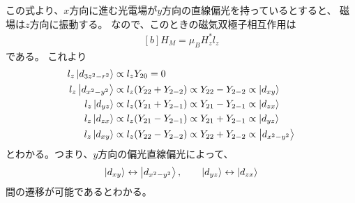 \documentclass[../ap_2011.tex]{subfiles}
\begin{document}
この式より、\(x\)方向に進む光電場が\(y\)方向の直線偏光を持っているとすると、
磁場は\(z\)方向に振動する。
なので、このときの磁気双極子相互作用は
\begin{equation}\begin{aligned}[b]
    H_M = \mu_BH_z^* l_z
\end{aligned}\end{equation}
である。
これより
\begin{equation}\begin{aligned}[b]
    l_z\ket{d_{3z^2-r^2}} &\propto l_z Y_{20} = 0\\
    l_z\ket{d_{x^2-y^2}} &\propto l_z (Y_{22}+Y_{2-2}) \propto Y_{22}-Y_{2-2} \propto \ket{d_{xy}}\\
    l_z\ket{d_{yz}} &\propto l_z (Y_{21}+Y_{2-1}) \propto Y_{21}-Y_{2-1}\propto \ket{d_{zx}}\\
    l_z\ket{d_{zx}} &\propto l_z (Y_{21}-Y_{2-1}) \propto Y_{21}+Y_{2-1} \propto \ket{d_{yz}}\\
    l_z\ket{d_{xy}} &\propto l_z (Y_{22}-Y_{2-2}) \propto Y_{22}+Y_{2-2} \propto \ket{d_{x^2-y^2}}
\end{aligned}\end{equation}
とわかる。つまり、\(y\)方向の偏光直線偏光によって、
\begin{equation}\begin{aligned}[b]
    \ket{d_{xy}}\leftrightarrow \ket{d_{x^2-y^2}},\qquad \ket{d_{yz}}\leftrightarrow \ket{d_{zx}}
\end{aligned}\end{equation}
間の遷移が可能であるとわかる。
\end{document}
